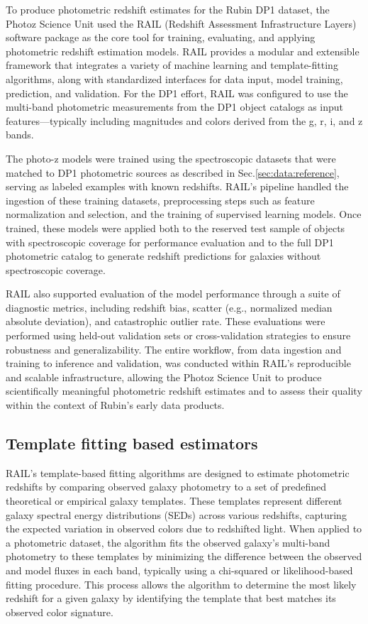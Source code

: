 To produce photometric redshift estimates for the Rubin DP1 dataset, the Photoz Science Unit used the RAIL (Redshift Assessment Infrastructure Layers) software package as the core tool for training, evaluating, and applying photometric redshift estimation models. RAIL provides a modular and extensible framework that integrates a variety of machine learning and template-fitting algorithms, along with standardized interfaces for data input, model training, prediction, and validation. For the DP1 effort, RAIL was configured to use the multi-band photometric measurements from the DP1 object catalogs as input features—typically including magnitudes and colors derived from the g, r, i, and z bands.

The photo-z models were trained using the spectroscopic datasets that were matched to DP1 photometric sources as described in Sec.\ref{sec:data:reference}, serving as labeled examples with known redshifts. RAIL's pipeline handled the ingestion of these training datasets, preprocessing steps such as feature normalization and selection, and the training of supervised learning models.  Once trained, these models were applied both to the reserved test sample of objects with spectroscopic coverage for performance evaluation and to
 the full DP1 photometric catalog to generate redshift predictions for galaxies without spectroscopic coverage.

RAIL also supported evaluation of the model performance through a suite of diagnostic metrics, including redshift bias, scatter (e.g., normalized median absolute deviation), and catastrophic outlier rate. These evaluations were performed using held-out validation sets or cross-validation strategies to ensure robustness and generalizability. The entire workflow, from data ingestion and training to inference and validation, was conducted within RAIL’s reproducible and scalable infrastructure, allowing the Photoz Science Unit to produce scientifically meaningful photometric redshift estimates and to assess their quality within the context of Rubin’s early data products.


\subsection{Template fitting based estimators}
\label{sec:method:template}

RAIL’s template-based fitting algorithms are designed to estimate photometric redshifts by comparing observed galaxy photometry to a set of predefined theoretical or empirical galaxy templates. These templates represent different galaxy spectral energy distributions (SEDs) across various redshifts, capturing the expected variation in observed colors due to redshifted light. When applied to a photometric dataset, the algorithm fits the observed galaxy’s multi-band photometry to these templates by minimizing the difference between the observed and model fluxes in each band, typically using a chi-squared or likelihood-based fitting procedure. This process allows the algorithm to determine the most likely redshift for a given galaxy by identifying the template that best matches its observed color signature.


